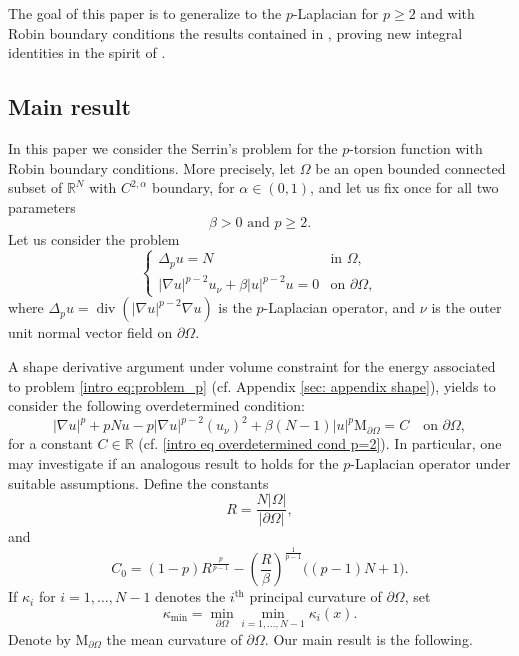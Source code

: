 \documentclass[10pt,a4paper, reqno]{amsart}
\numberwithin{equation}{section}
\newcommand{\R}{\mathbb{R}}
\renewcommand{\div}{\operatorname{div}}
\begin{document}
The goal of this paper is to generalize to the $p$-Laplacian for $p \geq 2$ and with Robin boundary conditions the results contained in \cite{gamo26}, proving new integral identities in the spirit of \cite{mapo19,mp2020,mp23}. 

\subsection{Main result}

In this paper we consider the Serrin’s problem for
the $p$-torsion function with Robin boundary conditions. More precisely, let $\Omega$ be an open bounded connected subset of $\R^N$ with $C^{2,\alpha}$ boundary, for $\alpha \in (0,1)$, and let us fix once for all two parameters
\[
\beta >  0 \text{ and } p \geq 2.
\]
Let us consider the problem
\begin{equation} \label{intro eq:problem_p}
    \begin{cases}
    \Delta_p u = N & \text{in } \Omega, \\
    |\nabla u|^{p-2} u_\nu  + \beta |u|^{p-2}u = 0 & \text{on } \partial\Omega,
    \end{cases}
\end{equation}
where $\Delta_p u = \div(|\nabla u|^{p-2}\nabla u)$ is the $p$-Laplacian operator, and $\nu$ is the outer unit normal vector field on $\partial\Omega$. 

A shape derivative argument under volume constraint for the energy associated to problem \eqref{intro eq:problem_p} (cf. Appendix \ref{sec: appendix shape}), yields to consider the following overdetermined condition:
\begin{equation}\label{intro eq overdetermined cond p}
   |\nabla u|^p + pNu - p |\nabla u|^{p-2} (u_\nu)^2 + \beta(N-1) |u|^p \mathrm{M}_{\partial\Omega} = C  \quad\text{on } \partial\Omega,
\end{equation}
for a constant $C\in \R$ (cf. \eqref{intro eq overdetermined cond p=2}). In particular, one may investigate if an analogous result to \cite[Thm. 1]{gamo26} holds for the $p$-Laplacian operator under suitable assumptions.
Define the constants
\begin{equation}\label{intro eq R}
        R = \frac{N|\Omega|}{|\partial\Omega|}, 
\end{equation}
and 
\begin{equation}\label{intro eq C0}
C_0 = (1-p)R^{\frac{p}{p-1}} - \left( \frac{R}{\beta} \right)^{\frac{1}{p-1}} \big( (p-1)N + 1 \big).    
\end{equation}
If $\kappa_i$ for $i=1, \dots,N-1$ denotes the $i^{\text{th}}$ principal curvature of $\partial \Omega$, set
\begin{equation}\label{intro k min}
    \kappa_{\min} = \min_{\partial \Omega} \min_{i=1,\dots,N-1}  \kappa_i(x).
\end{equation}
Denote by $\mathrm{M}_{\partial\Omega}$ the mean curvature of $\partial \Omega$. Our main result is the following.
\end{document}
